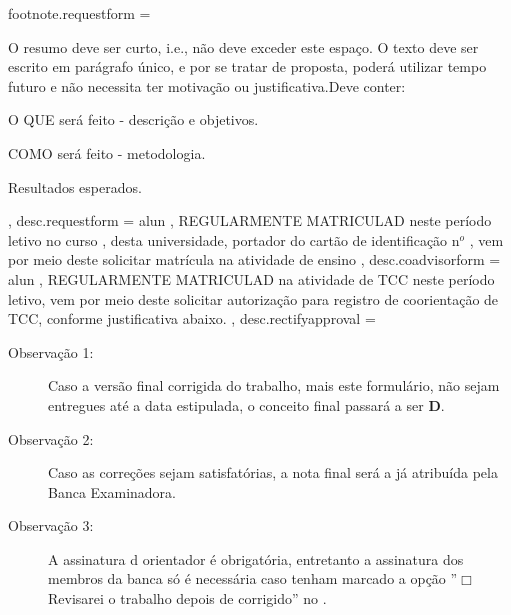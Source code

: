 {  %
 footnote.requestform       = { O resumo deve ser curto, i.e., não deve exceder este espaço. O texto deve ser escrito em parágrafo único, 
                                e por se tratar de proposta, poderá utilizar  tempo futuro e não necessita ter motivação ou justificativa.\break  Deve conter:
                                \begin{enumerate*}[alpha)] 
                                	\item O QUE será feito - descrição e objetivos.
                                   \item COMO será feito - metodologia.
                                	\item Resultados esperados.
                                \end{enumerate*}%
                                } ,   %
  desc.requestform          = {  alun , 
                              REGULARMENTE MATRICULAD neste período letivo no curso \emph{}, desta universidade, 
                              portador do cartão de identificação n$^o$ , 
                              vem por meio deste solicitar matrícula na atividade de ensino} ,
  desc.coadvisorform            = { alun , 
                              REGULARMENTE MATRICULAD na atividade de TCC neste período letivo, 
                              vem por meio deste solicitar autorização para registro de coorientação de TCC, conforme justificativa abaixo.} ,
  desc.rectifyapproval      = { \begin{description}
                              \item[Observação 1:] Caso a versão final corrigida do trabalho, mais este formulário, não sejam entregues até a data estipulada, o conceito final passará a ser {\bf D}.
                              \item[Observação 2:] Caso as correções sejam satisfatórias, a nota final será a já atribuída pela Banca Examinadora. 
                              \item[Observação 3:] A assinatura d orientador é obrigatória, entretanto a assinatura dos membros da banca só é necessária caso tenham marcado a opção ''$\Box$ Revisarei o trabalho depois de corrigido'' no \emph{}.

\end{description}}}
